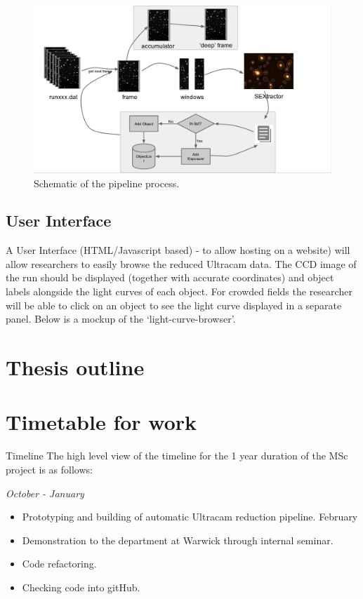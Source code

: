 \documentclass[a4paper,10pt]{article}
\begin{document}
\begin{figure}[!h]
	\centering
	\includegraphics[width=130mm]{images/flowchart.png}
	\caption{Schematic of the pipeline process.}
	\label{flowchart}
\end{figure}





\subsection{User Interface}
A User Interface (HTML/Javascript based) - to allow hosting on a website) will allow researchers to easily browse the reduced Ultracam data. The CCD image of the run should be displayed (together with accurate coordinates) and object labels alongside the light curves of each object. For crowded fields the researcher will be able to click on an object to see the light curve displayed in a separate panel. Below is a mockup of the ‘light-curve-browser’.



\section{Thesis outline}

\section{Timetable for work}

Timeline 
The high level view of the timeline for the 1 year duration of the MSc project is as follows:

\emph{October - January}
\begin{itemize} 
	\item Prototyping and building of automatic Ultracam reduction pipeline.
February
	\item Demonstration to the department at Warwick through internal seminar.
	\item Code refactoring.
	\item Checking code into gitHub.
\end{itemize}
\end{document}

